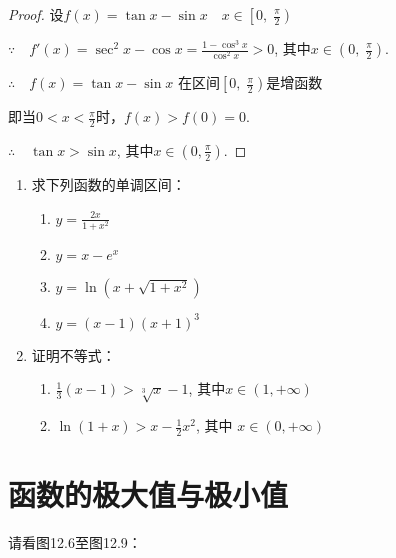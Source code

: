 \begin{proof}
    设$f(x)=\tan x- \sin x\quad x\in \left [ 0,\; \frac \pi 2\right )$

$\because\quad f'( x) = \sec ^{2}x- \cos x= \frac {1- \cos ^{3}x}{\cos ^{2}x}> 0$, 
其中$x\in\left(0,\; \frac\pi2\right)$.

$\therefore\quad f( x) =\tan x-\sin x$ 在区间$\left[0,\; \frac\pi2\right)$是增函数

即当$0<x<\frac{\pi}{2}$时，$f(x)>f(0)=0$. 

$\therefore\quad \tan x>\sin x$, 其中$x\in\left(0,\frac\pi2\right)$.
\end{proof}

\begin{ex}
\begin{enumerate}
    \item 求下列函数的单调区间：
\begin{multicols}{2}
\begin{enumerate}[(1)]
    \item $y=\frac{2x}{1+x^2}$
\item $y=x-e^{x}$
\item $y= \ln ( x+ \sqrt {1+ x^{2}})$ 
\item $y=(x-1)(x+1)^{3}$
\end{enumerate}
\end{multicols}

    
\item    证明不等式：
\begin{enumerate}[(1)]
    \item $\frac{1}{3}(x-1)>\sqrt[3]{x}-1$, 其中$x\in ( 1, + \infty )$
    \item $\ln(1+x)>x-\frac{1}{2}x^{2}$, 其中 $x\in(0,+\infty)$
\end{enumerate}
\end{enumerate} 
\end{ex}

\section{函数的极大值与极小值}
请看图12.6至图12.9：

